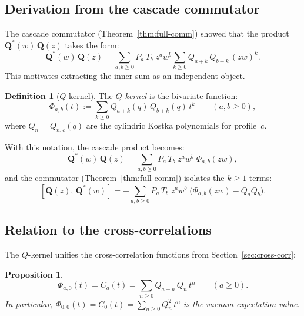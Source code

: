 \documentclass[11pt]{article}
\theoremstyle{plain}
\newtheorem{proposition}[theorem]{Proposition}
\theoremstyle{definition}
\newtheorem{definition}[theorem]{Definition}
\begin{document}
\subsection{Derivation from the cascade commutator}

The cascade commutator (Theorem~\ref{thm:full-comm}) showed that
the product $\mathbf{Q}^*(w)\, \mathbf{Q}(z)$ takes the form:
\begin{equation}\label{eq:QstarQ-full}
  \mathbf{Q}^*(w)\, \mathbf{Q}(z)
  = \sum_{a,b \geq 0} P_a\, T_b\; z^a w^b
    \sum_{k \geq 0} Q_{a+k}\, Q_{b+k}\, (zw)^k.
\end{equation}
This motivates extracting the inner sum as an independent object.

\begin{definition}[$Q$-kernel]
\label{def:Phi}
The \emph{$Q$-kernel} is the bivariate function:
\begin{equation}\label{eq:Phi}
  \Phi_{a,b}(t)
  := \sum_{k \geq 0} Q_{a+k}(q)\, Q_{b+k}(q)\, t^k
  \qquad (a, b \geq 0),
\end{equation}
where $Q_n = Q_{n,c}(q)$ are the cylindric Kostka polynomials for
profile~$c$.
\end{definition}

With this notation, the cascade product becomes:
\begin{equation}\label{eq:QstarQ-Phi}
  \mathbf{Q}^*(w)\, \mathbf{Q}(z)
  = \sum_{a,b \geq 0} P_a\, T_b\; z^a w^b\; \Phi_{a,b}(zw),
\end{equation}
and the commutator (Theorem~\ref{thm:full-comm}) isolates the
$k \geq 1$ terms:
\begin{equation}\label{eq:comm-Phi}
  [\mathbf{Q}(z),\, \mathbf{Q}^*(w)]
  = -\sum_{a,b \geq 0} P_a\, T_b\; z^a w^b\;
    \bigl(\Phi_{a,b}(zw) - Q_a Q_b\bigr).
\end{equation}

\subsection{Relation to the cross-correlations}

The $Q$-kernel unifies the cross-correlation functions from
Section~\ref{sec:cross-corr}:

\begin{proposition}\label{prop:Phi-Ca}
\begin{equation}\label{eq:Phi-Ca}
  \Phi_{a,0}(t) = C_a(t) = \sum_{n \geq 0} Q_{a+n}\, Q_n\, t^n
  \qquad (a \geq 0).
\end{equation}
In particular, $\Phi_{0,0}(t) = C_0(t) = \sum_{n \geq 0}
Q_n^2\, t^n$ is the vacuum expectation value.
\end{proposition}
\end{document}
